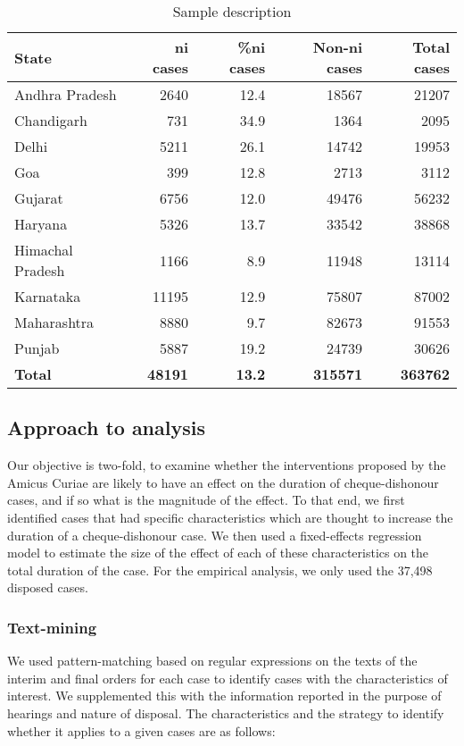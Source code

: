 \begin{longtable}{@{}lrrrr@{}}
\caption{Sample description}
\label{tab:sample_desc}\\
\toprule
\textbf{State} & \textbf{\gls{ni} cases} & \textbf{\%\gls{ni} cases} & \textbf{Non-\gls{ni} cases} & \textbf{Total cases}\\ \midrule
\endhead
Andhra Pradesh & 2640 & 12.4 & 18567 & 21207\\
Chandigarh & 731 & 34.9 & 1364 & 2095\\
Delhi & 5211 & 26.1 & 14742 & 19953\\
Goa & 399 & 12.8 & 2713 & 3112\\
Gujarat & 6756 & 12.0 & 49476 & 56232\\
Haryana & 5326 & 13.7 & 33542 & 38868\\
Himachal Pradesh & 1166 & 8.9 & 11948 & 13114\\
Karnataka & 11195 & 12.9 & 75807 & 87002\\
Maharashtra & 8880 & 9.7 & 82673 & 91553\\
Punjab & 5887 & 19.2 & 24739 & 30626\\
\textbf{Total} & \textbf{48191} & \textbf{13.2} & \textbf{315571} & \textbf{363762}\\ \bottomrule
\end{longtable}

\subsection{Approach to analysis}
\label{sec:approach-analysis}

Our objective is two-fold, to examine whether the interventions proposed by the Amicus Curiae are likely to have an effect on the duration of cheque-dishonour cases, and if so what is the magnitude of the effect. To that end, we first identified cases that had specific characteristics which are thought to increase the duration of a cheque-dishonour case. We then used a fixed-effects regression model to estimate the size of the effect of each of these characteristics on the total duration of the case. For the empirical analysis, we only used the 37,498 disposed cases.

\subsubsection{Text-mining}
\label{sec:text-mining}

We used pattern-matching based on regular expressions on the texts of
the interim and final orders for each case to identify cases with the
characteristics of interest. We supplemented this with the information
reported in the purpose of hearings and nature of disposal. The
characteristics and the strategy to identify whether it applies to a
given cases are as follows:

